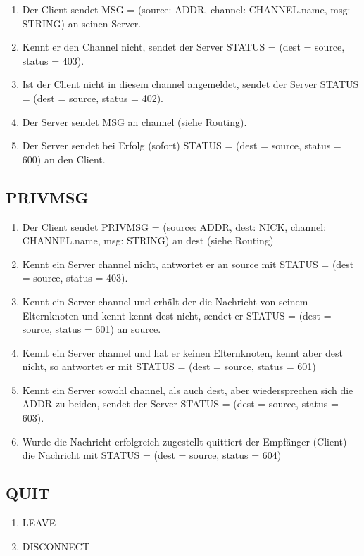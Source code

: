 \documentclass{article}
\begin{document}
\begin{enumerate}
  \item Der Client sendet MSG = (source: ADDR, channel: CHANNEL.name, msg: STRING) an seinen Server.
  \item Kennt er den Channel nicht, sendet der Server STATUS = (dest = source, status = 403).
  \item Ist der Client nicht in diesem channel angemeldet, sendet der Server STATUS = (dest = source, status = 402).
  \item Der Server sendet MSG an channel (siehe Routing).
  \item Der Server sendet bei Erfolg (sofort) STATUS = (dest = source, status = 600) an den Client.
\end{enumerate}

\subsection{PRIVMSG}

\begin{enumerate}
  \item Der Client sendet PRIVMSG = (source: ADDR, dest: NICK, channel: CHANNEL.name, msg: STRING) an dest (siehe Routing)
  \item Kennt ein Server channel nicht, antwortet er an source mit STATUS = (dest = source, status = 403).
  \item Kennt ein Server channel und erhält der die Nachricht von seinem Elternknoten und kennt kennt dest nicht, sendet er STATUS = (dest = source, status = 601) an source.
  \item Kennt ein Server channel und hat er keinen Elternknoten, kennt aber dest nicht, so antwortet er mit STATUS = (dest = source, status = 601)
  \item Kennt ein Server sowohl channel, als auch dest, aber wiedersprechen sich die ADDR zu beiden, sendet der Server STATUS = (dest = source, status = 603).
  \item Wurde die Nachricht erfolgreich zugestellt quittiert der Empfänger (Client) die Nachricht mit STATUS = (dest = source, status = 604)
\end{enumerate}

\subsection{QUIT}

\begin{enumerate}
  \item LEAVE
  \item DISCONNECT
\end{enumerate}
\end{document}
